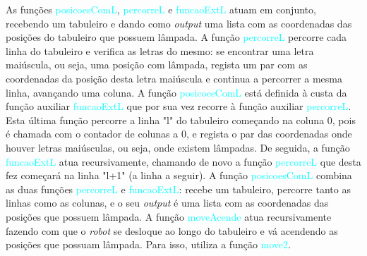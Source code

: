 \documentclass[12pt,a4paper]{article}
\begin{document}
\textsf{ \indent As fun\c{c}ões \textcolor{cyan}{posicoesComL}, \textcolor{cyan}{percorreL} e \textcolor{cyan}{funcaoExtL} atuam em conjunto, recebendo um tabuleiro e dando como \textit{output} uma lista com as coordenadas das posi\c{c}ões do tabuleiro que possuem lâmpada. A fun\c{c}ão \textcolor{cyan}{percorreL} percorre cada linha do tabuleiro e verifica as letras do mesmo: se encontrar uma letra maiúscula, ou seja, uma posi\c{c}ão com lâmpada, regista um par com as coordenadas da posi\c{c}ão desta letra maiúscula e continua a percorrer a mesma linha, avan\c{c}ando uma coluna. A fun\c{c}ão \textcolor{cyan}{posicoesComL} está definida à custa da fun\c{c}ão auxiliar \textcolor{cyan}{funcaoExtL} que por sua vez recorre à fun\c{c}ão auxiliar \textcolor{cyan}{percorreL}. Esta última fun\c{c}ão percorre a linha "l" do tabuleiro come\c{c}ando na coluna 0, pois é chamada com o contador de colunas a 0, e regista o par das coordenadas onde houver letras maiúsculas, ou seja, onde existem lâmpadas. De seguida, a fun\c{c}ão \textcolor{cyan}{funcaoExtL} atua recursivamente, chamando de novo a fun\c{c}ão \textcolor{cyan}{percorreL} que desta fez come\c{c}ará na linha "l+1" (a linha a seguir). A fun\c{c}ão \textcolor{cyan}{posicoesComL} combina as duas fun\c{c}ões \textcolor{cyan}{percorreL} e \textcolor{cyan}{funcaoExtL}: recebe um tabuleiro, percorre tanto as linhas como as colunas, e o seu \textit{output} é uma lista com as coordenadas das posi\c{c}ões que possuem lâmpada.}
\newline \textsf{ \indent A fun\c{c}ão \textcolor{cyan}{moveAcende} atua recursivamente fazendo com que o \textit{robot} se desloque ao longo do tabuleiro e vá acendendo as posi\c{c}ões que possuam lâmpada. Para isso, utiliza a fun\c{c}ão \textcolor{cyan}{move2}.} 
\end{document}
